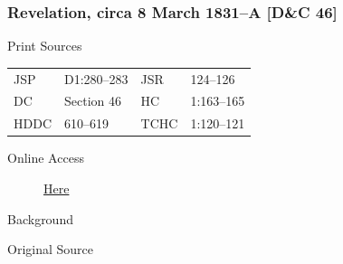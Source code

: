 		\subsubsection{Revelation, circa 8 March 1831--A [D\&C 46]}
			\label{EMS-1831-JS-CIR-8-MAR-1831-A}
		
			\begin{description}
				\item[Print Sources]
			\end{description}

				\begin{tabular}{p{0.5in}p{1in}p{0.5in}p{1in}}
				JSP	 	& D1:280--283	& JSR 		& 124--126 \\
				DC	 	& Section 46 	& HC 		& 1:163--165 \\
				HDDC 	& 610--619		& TCHC 		& 1:120--121 \\
				\end{tabular}
			
			\begin{description}
				\item[Online Access] \href{https://www.josephsmithpapers.org/paper-summary/revelation-circa-8-march-1831-a-dc-46/1}{Here}
			\end{description}
			
			\begin{description}
				\item[Background]
			\end{description}
			
			
			\begin{description}
				\item[Original Source]
			\end{description}
			
			
